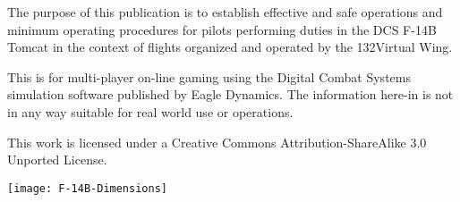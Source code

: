 The purpose of this publication is to establish effective and safe operations
and minimum operating procedures for pilots performing duties in the DCS F-14B
Tomcat in the context of flights organized and operated by the 132\nd Virtual
Wing.

This is for multi-player on-line gaming using the Digital Combat Systems
simulation software published by Eagle Dynamics. The information here-in is not
in any way suitable for real world use or operations.

This work is licensed under a Creative Commons Attribution-ShareAlike 3.0
Unported License.

\texttt{[image: F-14B-Dimensions]}
